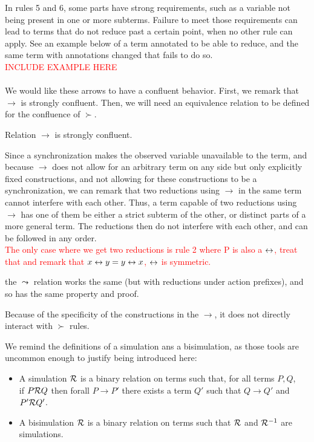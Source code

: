 \remark In rules 5 and 6, some parts have strong requirements, such as a variable not being present in one or more subterms. Failure to meet those requirements can lead to terms that do not reduce past a certain point, when no other rule can apply. See an example below of a term annotated to be able to reduce, and the same term with annotations changed that fails to do so.\\
\textcolor{red}{INCLUDE EXAMPLE HERE}\\~\\
We would like these arrows to have a confluent behavior. First, we remark that $\to$ is strongly confluent. Then, we will need an equivalence relation to be defined for the confluence of $\succ$.

\begin{proposition}
Relation $\to$ is strongly confluent.
\end{proposition}

\begin{myproof}
Since a synchronization makes the observed variable unavailable to the term, and because $\to$ does not allow for an arbitrary term on any side but only explicitly fixed constructions, and not allowing for these constructions to be a synchronization, we can remark that two reductions using $\to$ in the same term cannot interfere with each other. Thus, a term capable of two reductions using $\to$ has one of them be either a strict subterm of the other, or distinct parts of a more general term. The reductions then do not interfere with each other, and can be followed in any order.\\
\textcolor{red}{The only case where we get two reductions is rule 2 where P is also a $\leftrightarrow$, treat that and remark that $x\leftrightarrow y = y\leftrightarrow x$, \ie $\leftrightarrow$ is symmetric.} %
\end{myproof}

\remark the $\leadsto$ relation works the same (but with reductions under action prefixes), and so has the same property and proof.

Because of the specificity of the constructions in the $\to$, it does not directly interact with $\succ$ rules.

We remind the definitions of a simulation ans a bisimulation, as those tools are uncommon enough to justify being introduced here:

\begin{definition}
\begin{itemize}
	\item A simulation $\mathcal{R}$ is a binary relation on terms such that, for all terms $P,Q$,\\
		if $P \mathcal{R} Q$ then forall $P \to P'$ there exists a term $Q'$ such that $Q \to Q'$ and $P' \mathcal{R} Q'$.
	\item A bisimulation $\mathcal{R}$ is a binary relation on terms such that $\mathcal{R}$ and $\mathcal{R}^{-1}$ are simulations.
\end{itemize}
\end{definition}


